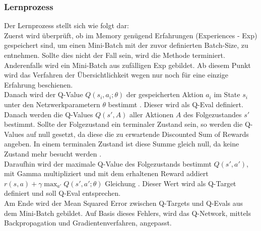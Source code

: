 \subsubsection{Lernprozess} \label{subsubsec:Konzept_Lernprozess_DQN}
Der Lernprozess stellt sich wie folgt dar:\\
Zuerst wird überprüft, ob im Memory genügend Erfahrungen (Experiences - Exp) gespeichert sind, um einen Mini-Batch mit der zuvor definierten Batch-Size, zu entnehmen. Sollte dies nicht der Fall sein, wird die Methode terminiert. Anderenfalls wird ein Mini-Batch aus zufälligen Exp gebildet. Ab diesem Punkt wird das Verfahren der Übersichtlichkeit wegen nur noch für eine einzige Erfahrung beschienen.\\
Danach wird der Q-Value $Q(s_i,a_i;\theta)$ der gespeicherten Aktion $a_i$ im State $s_i$ unter den Netzwerkparametern $\theta$ bestimmt . Dieser wird als Q-Eval definiert.\\
Danach werden die Q-Values $Q(s',A)$ aller Aktionen $A$ des Folgezustandes $s'$  bestimmt. Sollte der Folgezustand ein terminaler Zustand sein, so werden die Q-Values auf null gesetzt, da diese die zu erwartende Discounted Sum of Rewards angeben. In einem terminalen Zustand ist diese Summe gleich null, da keine Zustand mehr besucht werden .\\
Daraufhin wird der maximale Q-Value des Folgezustands bestimmt $Q(s',a')$, mit Gamma multipliziert und mit dem erhaltenen Reward addiert $r(s,a) + \gamma \max_{a'}Q(s',a';\theta)$ Gleichung . Dieser Wert wird als Q-Target definiert und soll Q-Eval entsprechen.\\
Am Ende wird der Mean Squared Error zwischen Q-Targets und Q-Evals aus dem Mini-Batch gebildet. Auf Basis dieses Fehlers, wird das Q-Network, mittels Backpropagation und Gradientenverfahren, angepasst.

